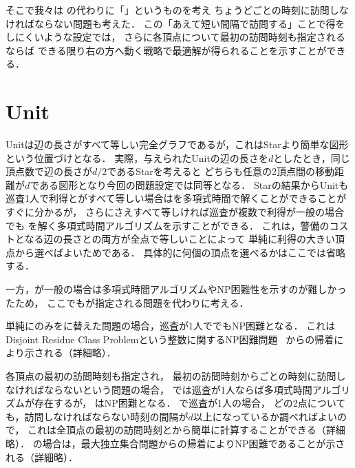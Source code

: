 そこで我々は
{\timelimit}の代わりに「{\period}」というものを考え
{\period}ちょうどごとの時刻に訪問しなければならない問題も考えた．
この「あえて短い間隔で訪問する」ことで得をしにくいような設定では，
さらに各頂点について最初の訪問時刻も指定されるならば
できる限り右の方へ動く戦略で最適解が得られることを示すことができる．





\section{Unit}


Unitは辺の長さがすべて等しい完全グラフであるが，これはStarより簡単な図形という位置づけとなる．
実際，与えられたUnitの辺の長さを$d$としたとき，同じ頂点数で辺の長さが$d/2$であるStarを考えると
どちらも任意の2頂点間の移動距離が$d$である図形となり今回の問題設定では同等となる．
Starの結果からUnitも
巡査1人で利得と{\timelimit}がすべて等しい場合は{\optpp}を多項式時間で解くことができることがすぐに分かるが，
さらに{\timelimit}さえすべて等しければ巡査が複数で利得が一般の場合でも
{\optpp}を解く多項式時間アルゴリズムを示すことができる．
%
これは，警備のコストとなる辺の長さと{\timelimit}の両方が全点で等しいことによって
単純に利得の大きい頂点から選べばよいためである．
具体的に何個の頂点を選べるかはここでは省略する．



一方，{\timelimit}が一般の場合は多項式時間アルゴリズムやNP困難性を示すのが難しかったため，
ここでも{\period}が指定される問題を代わりに考える．

単純に{\timelimit}のみを{\period}に替えた問題の場合，巡査が1人で{\decisionpp}でもNP困難となる．
これは
Disjoint Residue Class Problemという整数に関するNP困難問題~\cite{kawamura2015simple}
からの帰着により示される（詳細略）．


各頂点の最初の訪問時刻も指定され，
最初の訪問時刻から{\period}ごとの時刻に訪問しなければならないという問題の場合，
%
\decisionpp では巡査が1人ならば多項式時間アルゴリズムが存在するが，
\optpp はNP困難となる．
%
{\decisionpp}で巡査が1人の場合，
どの2点についても，訪問しなければならない時刻の間隔が$d$以上になっているか調べればよいので，
これは全頂点の最初の訪問時刻と{\period}から簡単に計算することができる（詳細略）．
%
{\optpp}の場合は，最大独立集合問題からの帰着によりNP困難であることが示される（詳細略）．


